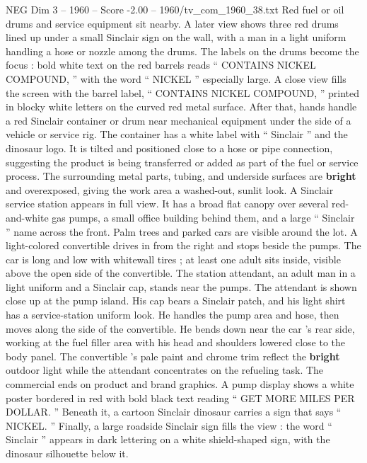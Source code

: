 \begin{textsample}{NEG Dim 3 – 1960 – Score -2.00 – 1960/tv\_com\_1960\_38.txt}
Red fuel or oil drums and service equipment sit nearby.
A later view shows three red drums lined up under a small Sinclair sign on the wall, with a man in a light uniform handling a hose or nozzle among the drums.
The labels on the drums become the focus : bold white text on the red barrels reads “ CONTAINS NICKEL COMPOUND, ” with the word “ NICKEL ” especially large.
A close view fills the screen with the barrel label, “ CONTAINS NICKEL COMPOUND, ” printed in blocky white letters on the curved red metal surface.
After that, hands handle a red Sinclair container or drum near mechanical equipment under the side of a vehicle or service rig.
The container has a white label with “ Sinclair ” and the dinosaur logo.
It is tilted and positioned close to a hose or pipe connection, suggesting the product is being transferred or added as part of the fuel or service process.
The surrounding metal parts, tubing, and underside surfaces are \textbf{bright} and overexposed, giving the work area a washed-out, sunlit look.
A Sinclair service station appears in full view.
It has a broad flat canopy over several red-and-white gas pumps, a small office building behind them, and a large “ Sinclair ” name across the front.
Palm trees and parked cars are visible around the lot.
A light-colored convertible drives in from the right and stops beside the pumps.
The car is long and low with whitewall tires ; at least one adult sits inside, visible above the open side of the convertible.
The station attendant, an adult man in a light uniform and a Sinclair cap, stands near the pumps.
The attendant is shown close up at the pump island.
His cap bears a Sinclair patch, and his light shirt has a service-station uniform look.
He handles the pump area and hose, then moves along the side of the convertible.
He bends down near the car ’s rear side, working at the fuel filler area with his head and shoulders lowered close to the body panel.
The convertible ’s pale paint and chrome trim reflect the \textbf{bright} outdoor light while the attendant concentrates on the refueling task.
The commercial ends on product and brand graphics.
A pump display shows a white poster bordered in red with bold black text reading “ GET MORE MILES PER DOLLAR. ” Beneath it, a cartoon Sinclair dinosaur carries a sign that says “ NICKEL. ” Finally, a large roadside Sinclair sign fills the view : the word “ Sinclair ” appears in dark lettering on a white shield-shaped sign, with the dinosaur silhouette below it.

\end{textsample}
